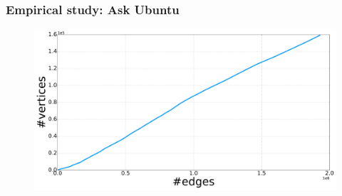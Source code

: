 \documentclass[final,hyperref={pdfpagelabels=false},noamsthm]{beamer}
\begin{document}
%

\begin{frame}
	\frametitle{Empirical study: Ask Ubuntu}
	\begin{figure}[h]
		\includegraphics[width=1.0\textwidth]{fig/n_askubuntu_arrival.pdf}
	\end{figure}
\end{frame}
\end{document}
